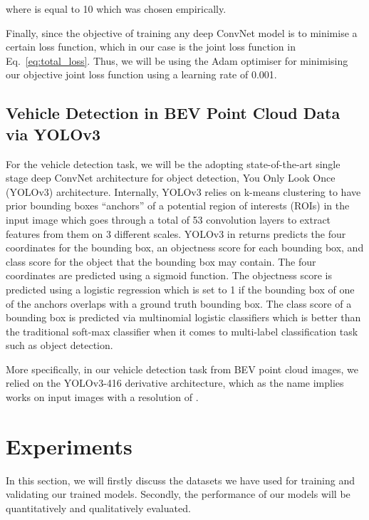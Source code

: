\documentclass[letterpaper, 10 pt, conference]{IEEEtran}
\begin{document}
where  is equal to 10 which was chosen empirically. 

\smallbreak
Finally, since the objective of training any deep ConvNet model is to minimise a certain loss function,  which in our case is the joint loss function in Eq.~\ref{eq:total_loss}. Thus, we will be using the Adam optimiser for minimising our objective joint loss function using a learning rate of 0.001.

\subsection{Vehicle Detection in BEV Point Cloud Data via YOLOv3}
For the vehicle detection task, we will be the adopting state-of-the-art single stage deep ConvNet architecture for object detection, You Only Look Once (YOLOv3) architecture. Internally, YOLOv3 relies on k-means clustering to have prior bounding boxes ``anchors'' of a potential region of interests (ROIs) in the input image which goes through a total of 53 convolution layers to extract features from them on 3 different scales. YOLOv3 in returns predicts the four coordinates for the bounding box, an objectness score for each bounding box, and class score for the object that the bounding box may contain. The four coordinates are predicted using a sigmoid function. The objectness score is predicted using a logistic regression which is set to 1 if the bounding box of one of the anchors overlaps with a ground truth bounding box. The class score of a bounding box is predicted via multinomial logistic classifiers which is better than the traditional soft-max classifier when it comes to multi-label classification task such as object detection. 

\smallbreak
More specifically, in our vehicle detection task from BEV point cloud images, we relied on the YOLOv3-416 derivative architecture, which as the name implies works on input images with a resolution of . 

\section{Experiments}\label{exper}
In this section, we will firstly discuss the datasets we have used for training and validating our trained models. Secondly, the performance of our models will be quantitatively and qualitatively evaluated. 
\end{document}
